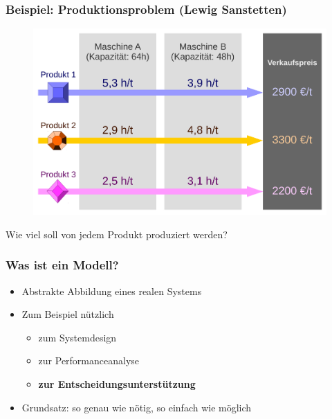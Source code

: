 
\begin{frame}
 \frametitle{Beispiel: Produktionsproblem (Lewig Sanstetten)}
 \begin{figure}
  \centering
  \includegraphics[width=\linewidth]{Bilder/LewigSanstetten}
 \end{figure}
 
 Wie viel soll von jedem Produkt produziert werden?
\end{frame}

\begin{frame}
 \frametitle{Was ist ein Modell?}
 \begin{itemize}
  \item Abstrakte Abbildung eines realen Systems
  \item Zum Beispiel nützlich
  \begin{itemize}
   \item zum Systemdesign
   \item zur Performanceanalyse
   \item \textbf{zur Entscheidungsunterstützung}
  \end{itemize}
  \item Grundsatz: so genau wie nötig, so einfach wie möglich
 \end{itemize}
\end{frame}

